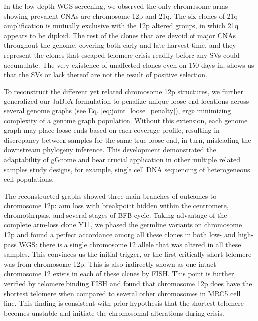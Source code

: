 \documentclass[phd,tocprelim]{cornell}
\begin{document}
In the low-depth WGS screening, we observed the only chromosome arms showing prevalent CNAs are chromosome 12p and 21q. The six clones of 21q amplification is mutually exclusive with the 12p altered groups, in which 21q appears to be diploid. The rest of the clones that are devoid of major CNAs throughout the genome, covering both early and late harvest time, and they represent the clones that escaped telomere crisis readily before any SVs could accumulate. The very existence of unaffected clones even on 150 days in, shows us that the SVs or lack thereof are not the result of positive selection.

To reconstruct the different yet related chromosome 12p structures, we further generalized our JaBbA formulation to penalize unique loose end locations across several genome graphs (see Eq. \ref{eq:joint_loose_penalty}), ergo minimizing complexity of a genome graph population. Without this extension, each genome graph may place loose ends based on each coverage profile, resulting in discrepancy between samples for the same true loose end, in turn, misleading the downstream phylogeny inference. This development demonstrated the adaptability of gGnome and bear crucial application in other multiple related samples study designs, for example, single cell DNA sequencing of heterogeneous cell populations.

The reconstructed graphs showed three main branches of outcomes to chromosome 12p: arm loss with breakpoint hidden within the centromere, chromothripsis, and several stages of BFB cycle. Taking advantage of the complete arm-loss clone Y11, we phased the germline variants on chromosome 12p and found a perfect accordance among all these clones in both low- and high-pass WGS: there is a single chromosome 12 allele that was altered in all these samples. This convinces us the initial trigger, or the first critically short telomere was from chromosome 12p. This is also indirectly shown as one intact chromosome 12 exists in each of these clones by FISH. This point is further verified by telomere binding FISH and found that chromosome 12p does have the shortest telomere when compared to several other chromosomes in MRC5 cell line. This finding is consistent with prior hypothesis that the shortest telomere becomes unstable and initiate the chromosomal alterations during crisis.
\end{document}

